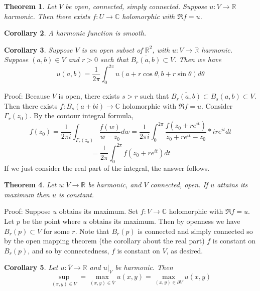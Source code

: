 \documentclass[11pt]{article}
\theoremstyle{plain}
\newtheorem{theorem}{Theorem}[section]
\newtheorem{corollary}[theorem]{Corollary}
\theoremstyle{definition}
\newcommand{\C}{\mathbb{C}}
\newcommand{\R}{\mathbb{R}}
\begin{document}
\begin{theorem}
Let $V$ be open, connected, simply connected. Suppose $u: V \to \R$ harmonic. Then there exists $f: U \to \C$ holomorphic with $\Re f = u$.
\end{theorem}

\begin{corollary}
A harmonic function is smooth.
\end{corollary}

\begin{corollary}
Suppose $V$ is an open subset of $\R^2$, with $u:V\to\R$ harmonic. Suppose $(a,b) \in V$ and $r>0$ such that $\overline{B_r(a,b)} \subset V$. Then we have
$$ u(a,b) = \frac{1}{2\pi} \int_0^{2 \pi} u(a + r\cos \theta, b + r\sin \theta)d\theta $$
\end{corollary}

Proof: Because $V$ is open, there exists $s > r$ such that $\overline{B_r(a,b)} \subset B_s(a,b)\subset V$. Then there exists $f: B_s(a + bi) \to \C$ holomorphic with $\Re f = u$. Consider $\Gamma_r(z_0)$. By the contour integral formula,
$$ f(z_0) = \frac{1}{2\pi i} \int_{\Gamma_r(z_0)} \frac{f(w)}{w- z_0}dw = \frac{1}{2\pi i} \int_0^{2\pi} \frac{f(z_0 + re^{it})}{z_0 + re^{it} - z_0} * ire^{it} dt $$
$$ = \frac{1}{2\pi} \int_0^{2\pi} f(z_0 + re^{it})dt $$
If we just consider the real part of the integral, the answer follows.

\begin{theorem}
Let $u:V\to\R$ be harmonic, and $V$ connected, open. If $u$ attains its maximum then $u$ is constant. 
\end{theorem}

Proof: Suppose $u$ obtains its maximum. Set $f:V\to\C$ holomorphic with $\Re f = u$. Let $p$ be the point where $u$ obtains its maximum. Then by openness we have $B_r(p) \subset V$ for some $r$. Note that $B_r(p)$ is connected and simply connected so by the open mapping theorem (the corollary about the real part) $f$ is constant on $B_r(p)$, and so by connectedness, $f$ is constant on $V$, as desired. 

\begin{corollary}
Let $u:\overline{V} \to \R$ and $u|_V$ be harmonic. Then
$$ \sup_{(x,y) \in V} = \max_{(x,y) \in \overline{V}} u(x,y) = \max_{(x,y) \in \partial V} u(x,y) $$
\end{corollary}
\end{document}
